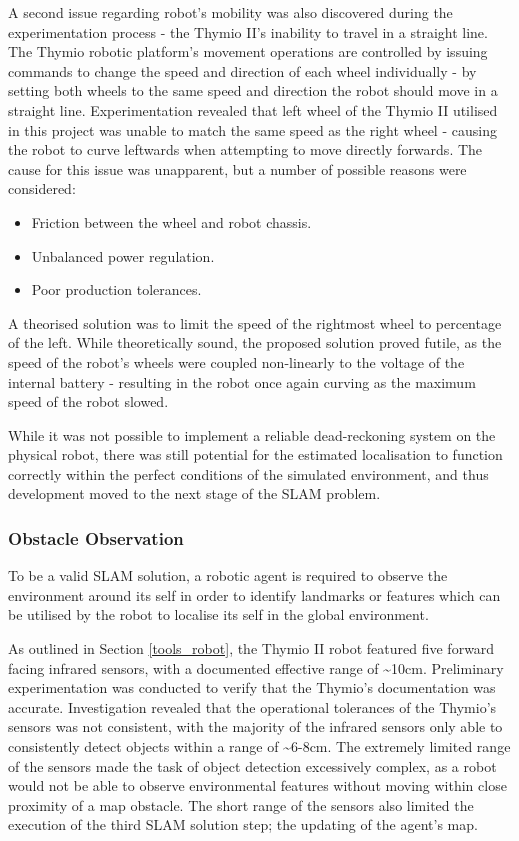A second issue regarding robot's mobility was also discovered during the
experimentation process - the Thymio II's inability to travel in a straight
line.  
The Thymio robotic platform's movement operations are controlled by issuing
commands to change the speed and direction of each wheel individually - by
setting both wheels to the same speed and direction the robot should move in a
straight line.
Experimentation revealed that left wheel of the Thymio II utilised in this
project was unable to match the same speed as the right wheel - causing the
robot to curve leftwards when attempting to move directly forwards.
The cause for this issue was unapparent, but a number of possible reasons were
considered:

\begin{itemize}
\item Friction between the wheel and robot chassis.
\item Unbalanced power regulation.
\item Poor production tolerances.
\end{itemize}

A theorised solution was to limit the speed of the rightmost wheel to
percentage of the left.
While theoretically sound, the proposed solution proved futile, as the speed of
the robot's wheels were coupled non-linearly to the voltage of the internal
battery - resulting in the robot once again curving as the maximum speed of
the robot slowed.

While it was not possible to implement a reliable dead-reckoning
system on the physical robot, there was still potential for the estimated
localisation to function correctly within the perfect conditions of the
simulated environment, and thus development moved to the next stage of the
SLAM problem.

\subsubsection{Obstacle Observation}
To be a valid SLAM solution, a robotic agent is required to observe the
environment around its self in order to identify landmarks or features which
can be utilised by the robot to localise its self in the global environment.

As outlined in Section \ref{tools_robot}, the Thymio II robot featured five
forward facing infrared sensors, with a documented effective range of \~{}10cm.
Preliminary experimentation was conducted to verify that the Thymio's
documentation was accurate.
Investigation revealed that the operational tolerances of the Thymio's sensors
was not consistent, with the majority of the infrared sensors only able to
consistently detect objects within a range of \~{}6-8cm.
The extremely limited range of the sensors made the task of object detection
excessively complex, as a robot would not be able to observe environmental
features without moving within close proximity of a map obstacle.
The short range of the sensors also limited the execution of the third SLAM
solution step; the updating of the agent's map.

